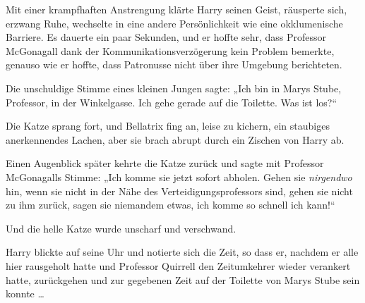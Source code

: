 Mit einer krampfhaften Anstrengung klärte Harry seinen Geist, räusperte sich, erzwang Ruhe, wechselte in eine andere Persönlichkeit wie eine okklumenische Barriere. Es dauerte ein paar Sekunden, und er hoffte sehr, dass Professor McGonagall dank der Kommunikationsverzögerung kein Problem bemerkte, genauso wie er hoffte, dass Patronusse nicht über ihre Umgebung berichteten.

Die unschuldige Stimme eines kleinen Jungen sagte:
„Ich bin in Marys Stube, Professor, in der Winkelgasse. Ich gehe gerade auf die Toilette. Was ist los?“

Die Katze sprang fort, und Bellatrix fing an, leise zu kichern, ein staubiges anerkennendes Lachen, aber sie brach abrupt durch ein Zischen von Harry ab.

Einen Augenblick später kehrte die Katze zurück und sagte mit Professor McGonagalls Stimme:
„Ich komme sie jetzt sofort abholen. Gehen sie \emph{nirgendwo} hin, wenn sie nicht in der Nähe des Verteidigungsprofessors sind, gehen sie nicht zu ihm zurück, sagen sie niemandem etwas, ich komme so schnell ich kann!“

Und die helle Katze wurde unscharf und verschwand.

Harry blickte auf seine Uhr und notierte sich die Zeit, so dass er, nachdem er alle hier rausgeholt hatte und Professor Quirrell den Zeitumkehrer wieder verankert hatte, zurückgehen und zur gegebenen Zeit auf der Toilette von Marys Stube sein konnte …

